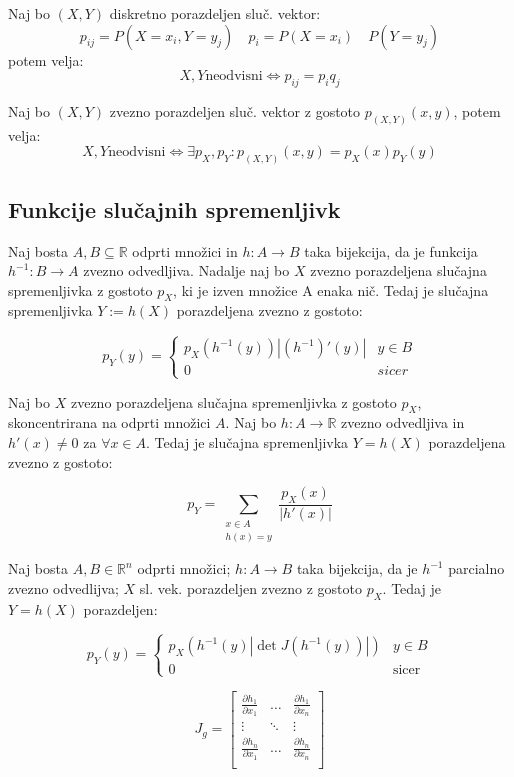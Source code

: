 \begin{multicols}{5}
Naj bo $(X, Y)$ diskretno porazdeljen sluč. vektor:
\[ p_{ij} = P(X = x_i, Y = y_j) \quad p_i = P(X = x_i) \quad P(Y = y_j) \]
potem velja:
\[ X, Y \text{neodvisni} \iff p_{ij} = p_i q_j \]


Naj bo $(X, Y)$ zvezno porazdeljen sluč. vektor z gostoto $ p_{(X, Y)}(x,y)$, potem velja:
\[ X, Y \text{neodvisni} \iff \exists p_X, p_Y: p_{(X,Y)}(x,y) = p_X(x) p_Y(y)\]

\subsection{Funkcije slučajnih spremenljivk}
Naj bosta $A, B \subseteq \mathbb{R}$ odprti množici in $h: A \to B$ taka bijekcija, da je funkcija
$h^{-1}: B \to A$ zvezno odvedljiva. Nadalje naj bo $X$ zvezno porazdeljena slučajna
spremenljivka z gostoto $p_X$, ki je izven množice A enaka nič. Tedaj je slučajna
spremenljivka $Y := h(X)$ porazdeljena zvezno z gostoto:

\[ p_Y(y) = \begin{cases}
    p_X\left( h^{-1}(y) \right) \left|(h^{-1})'(y)\right| & y \in B \\
    0 & sicer	
\end{cases}\]

Naj bo $X$ zvezno porazdeljena slučajna spremenljivka z gostoto $p_X$, skoncentrirana na odprti množici $A$. Naj bo $h: A \to \mathbb{R}$ zvezno odvedljiva in $h'(x) \neq 0$ za $\forall x \in A$. 
Tedaj je slučajna spremenljivka $Y = h(X)$ porazdeljena zvezno z gostoto:

\[ p_Y = \sum_{\substack{x \in A \\ h(x) = y}} \frac{p_X(x)}{|h'(x)|}\]

Naj bosta $A, B \in \mathbb{R}^n$ odprti množici; $h: A \to B$ taka bijekcija, da je $h^{-1}$ parcialno zvezno odvedlijva; $X$ sl. vek. porazdeljen zvezno z gostoto $p_X$.
Tedaj je $Y = h(X)$ porazdeljen:

\[ p_Y(y) = \begin{cases}
    p_X(h^{-1}(y) |\det J(h^{-1}(y))|) & y \in B \\
    0 & \text{sicer}
\end{cases}\]

\[
    J_g = \begin{bmatrix}
        \frac{\partial h_1}{\partial x_1} & \dots & \frac{\partial h_1}{\partial x_n} \\
        \vdots & \ddots & \vdots \\
        \frac{\partial h_n}{\partial x_1} & \dots & \frac{\partial h_n}{\partial x_n} \\
    \end{bmatrix}
\]



\end{multicols}
